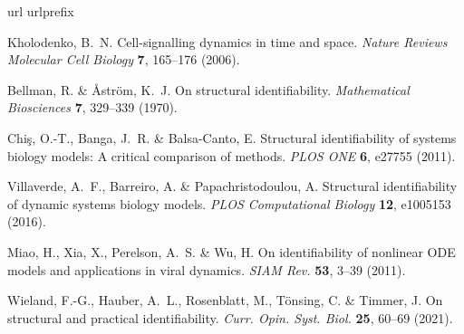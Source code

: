 \begin{thebibliography}{48}
\expandafter\ifx\csname url\endcsname\relax
  \def\url#1{\burl{#1}}\fi
\expandafter\ifx\csname urlprefix\endcsname\relax\def\urlprefix{URL }\fi
\providecommand{\bibinfo}[2]{#2}
\providecommand{\eprint}[2][]{\url{#2}}
\providecommand{\doi}[1]{\url{https://doi.org/#1}}
\bibcommenthead

\bibinfo{author}{Kholodenko, B.~N.}
\newblock \bibinfo{title}{Cell-signalling dynamics in time and space}.
\newblock \emph{\bibinfo{journal}{Nature Reviews Molecular Cell Biology}}
  \textbf{\bibinfo{volume}{7}}, \bibinfo{pages}{165--176}
  (\bibinfo{year}{2006}).

\bibinfo{author}{Bellman, R.} \& \bibinfo{author}{{\AA}str{\"o}m, K.~J.}
\newblock \bibinfo{title}{On structural identifiability}.
\newblock \emph{\bibinfo{journal}{Mathematical Biosciences}}
  \textbf{\bibinfo{volume}{7}}, \bibinfo{pages}{329--339}
  (\bibinfo{year}{1970}).

\bibinfo{author}{Chi{\c{s}}, O.-T.}, \bibinfo{author}{Banga, J.~R.} \&
  \bibinfo{author}{Balsa-Canto, E.}
\newblock \bibinfo{title}{Structural identifiability of systems biology models:
  A critical comparison of methods}.
\newblock \emph{\bibinfo{journal}{PLOS ONE}} \textbf{\bibinfo{volume}{6}},
  \bibinfo{pages}{e27755} (\bibinfo{year}{2011}).

\bibinfo{author}{Villaverde, A.~F.}, \bibinfo{author}{Barreiro, A.} \&
  \bibinfo{author}{Papachristodoulou, A.}
\newblock \bibinfo{title}{Structural identifiability of dynamic systems biology
  models}.
\newblock \emph{\bibinfo{journal}{PLOS Computational Biology}}
  \textbf{\bibinfo{volume}{12}}, \bibinfo{pages}{e1005153}
  (\bibinfo{year}{2016}).

\bibinfo{author}{Miao, H.}, \bibinfo{author}{Xia, X.}, \bibinfo{author}{Perelson, A.~S.} \& \bibinfo{author}{Wu, H.}
\newblock \bibinfo{title}{On identifiability of nonlinear {ODE} models and applications in viral dynamics}.
\newblock \emph{\bibinfo{journal}{SIAM Rev.}} \textbf{\bibinfo{volume}{53}}, \bibinfo{pages}{3--39} (\bibinfo{year}{2011}).

\bibinfo{author}{Wieland, F.-G.}, \bibinfo{author}{Hauber, A.~L.}, \bibinfo{author}{Rosenblatt, M.}, \bibinfo{author}{T{\"o}nsing, C.} \& \bibinfo{author}{Timmer, J.}
\newblock \bibinfo{title}{On structural and practical identifiability}.
\newblock \emph{\bibinfo{journal}{Curr. Opin. Syst. Biol.}} \textbf{\bibinfo{volume}{25}}, \bibinfo{pages}{60--69} (\bibinfo{year}{2021}).


\end{thebibliography}
